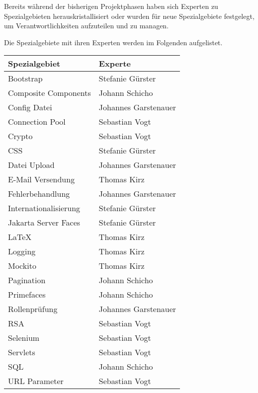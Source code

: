 
Bereits während der bisherigen Projektphasen haben sich Experten zu
Spezialgebieten herauskristallisiert oder wurden für neue Spezialgebiete
festgelegt, um Verantwortlichkeiten aufzuteilen und zu managen.

Die Spezialgebiete mit ihren Experten werden im Folgenden aufgelistet.

\begin{table}[h]
	\centering
	\begin{tabular}{|l|l|}
	\hline
	\textbf{Spezialgebiet} & \textbf{Experte} \\\hline
	\hline
	Bootstrap & Stefanie Gürster \\\hline
	Composite Components & Johann Schicho \\\hline
	Config Datei & Johannes Garstenauer \\\hline
	Connection Pool & Sebastian Vogt \\\hline
	Crypto & Sebastian Vogt \\\hline
	CSS & Stefanie Gürster \\\hline
	Datei Upload & Johannes Garstenauer \\\hline
	E-Mail Versendung & Thomas Kirz \\\hline
	Fehlerbehandlung & Johannes Garstenauer \\\hline
	Internationalisierung & Stefanie Gürster \\\hline
	Jakarta Server Faces & Stefanie Gürster \\\hline
	\LaTeX & Thomas Kirz \\\hline
	Logging & Thomas Kirz \\\hline
	Mockito & Thomas Kirz \\\hline
	Pagination & Johann Schicho \\\hline
	Primefaces & Johann Schicho \\\hline
	Rollenprüfung & Johannes Garstenauer \\\hline
	RSA & Sebastian Vogt \\\hline
	Selenium & Sebastian Vogt \\\hline
	Servlets & Sebastian Vogt \\\hline
	SQL & Johann Schicho \\\hline
	URL Parameter & Sebastian Vogt \\\hline
\end{tabular}
\end{table}
